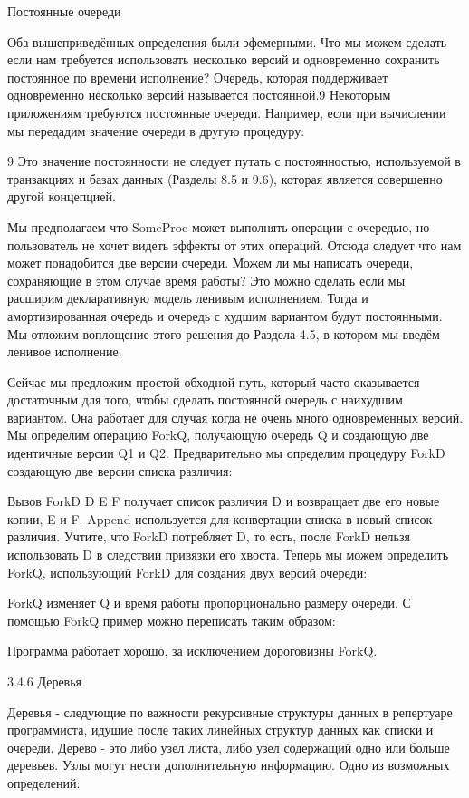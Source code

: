 Постоянные очереди

Оба вышеприведённых определения были эфемерными. Что мы можем сделать если нам требуется использовать несколько версий и одновременно сохранить постоянное по времени исполнение? Очередь, которая поддерживает одновременно несколько версий называется постоянной.9 Некоторым приложениям требуются постоянные очереди. Например, если при вычислении мы передадим значение очереди в другую процедуру:

9 Это значение постоянности не следует путать с постоянностью, используемой в транзакциях и базах данных (Разделы 8.5 и 9.6), которая является совершенно другой концепцией.

Мы предполагаем что SomeProc может выполнять операции с очередью, но пользователь не хочет видеть эффекты от этих операций. Отсюда следует что нам может понадобится две версии очереди. Можем ли мы написать очереди, сохраняющие в этом случае время работы? Это можно сделать если мы расширим декларативную модель ленивым исполнением. Тогда и амортизированная очередь и очередь с худшим вариантом будут постоянными. Мы отложим воплощение этого решения до Раздела 4.5, в котором мы введём ленивое исполнение.

Сейчас мы предложим простой обходной путь, который часто оказывается достаточным для того, чтобы сделать постоянной очередь с наихудшим вариантом. Она работает для случая когда не очень много одновременных версий. Мы определим операцию ForkQ, получающую очередь Q и создающую две идентичные версии Q1 и Q2. Предварительно мы определим процедуру ForkD создающую две версии списка различия:

Вызов {ForkD D E F} получает список различия D и возвращает две его новые копии, E и F. Append используется для конвертации списка в новый список различия. Учтите, что ForkD потребляет D, то есть, после ForkD нельзя использовать D в следствии привязки его хвоста. Теперь мы можем определить ForkQ, использующий ForkD для создания двух версий очереди:

ForkQ изменяет Q и время работы пропорционально размеру очереди. С помощью ForkQ пример можно переписать таким образом:

Программа работает хорошо, за исключением дороговизны ForkQ.

3.4.6 Деревья

Деревья - следующие по важности рекурсивные структуры данных в репертуаре программиста, идущие после таких линейных структур данных как списки и очереди. Дерево - это либо узел листа, либо узел содержащий одно или больше деревьев. Узлы могут нести дополнительную информацию. Одно из возможных определений:

